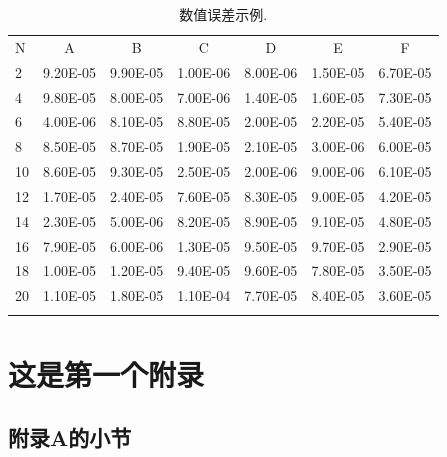 \documentclass[UTF8,openany,twoside,12pt]{book}
\makeatletter
\renewcommand{\chaptermark}[1]{\markboth{\thechapter ~ #1}{}}
\renewcommand{\chaptername}{第\arabic{chapter}章}
\renewcommand{\thesection}{\arabic{chapter}.\arabic{section}}
\renewcommand{\chaptermark}[1]{\markboth{\ifnum \value{secnumdepth}>-1
\if@mainmatter \chaptername ~ \fi\fi #1}{}}
\theoremstyle{plain}
\makeatother
\begin{document}
\begin{table}[htp!]
\centering
\renewcommand\arraystretch{1.2} %
\caption{数值误差示例.}
\label{tab:error2}
\begin{tabularx}{0.9\textwidth}{||P{1cm}|C|C|C|C|C|C||}
\Xhline{2\arrayrulewidth}
N  & A       & B    & C       & D      & E       & F   \\
\Xhline{2\arrayrulewidth}
2  & 9.20E-05 & 9.90E-05 & 1.00E-06 & 8.00E-06 & 1.50E-05 & 6.70E-05 \\
4  & 9.80E-05 & 8.00E-05 & 7.00E-06 & 1.40E-05 & 1.60E-05 & 7.30E-05 \\
6  & 4.00E-06 & 8.10E-05 & 8.80E-05 & 2.00E-05 & 2.20E-05 & 5.40E-05 \\
8  & 8.50E-05 & 8.70E-05 & 1.90E-05 & 2.10E-05 & 3.00E-06 & 6.00E-05 \\
10 & 8.60E-05 & 9.30E-05 & 2.50E-05 & 2.00E-06 & 9.00E-06 & 6.10E-05 \\
12 & 1.70E-05 & 2.40E-05 & 7.60E-05 & 8.30E-05 & 9.00E-05 & 4.20E-05 \\
14 & 2.30E-05 & 5.00E-06 & 8.20E-05 & 8.90E-05 & 9.10E-05 & 4.80E-05 \\
16 & 7.90E-05 & 6.00E-06 & 1.30E-05 & 9.50E-05 & 9.70E-05 & 2.90E-05 \\
18 & 1.00E-05 & 1.20E-05 & 9.40E-05 & 9.60E-05 & 7.80E-05 & 3.50E-05 \\
20 & 1.10E-05 & 1.80E-05 & 1.10E-04   & 7.70E-05 & 8.40E-05 & 3.60E-05  \\
\Xhline{2\arrayrulewidth}
\end{tabularx}
\end{table}





\appendix
\renewcommand{\chaptername}{附录 \Alph{chapter}}
\renewcommand{\thesection}{\Alph{chapter}.\arabic{section}}



\chapter{这是第一个附录}
\section{附录A的小节}
\end{document}
